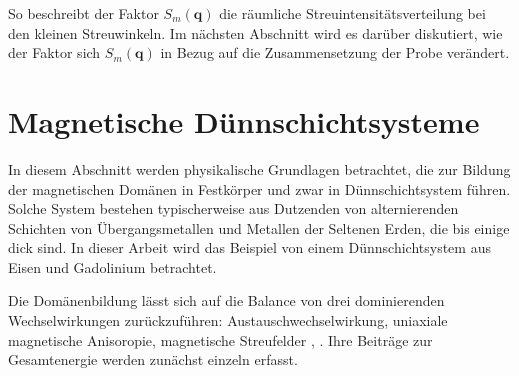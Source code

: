 \noindent
So beschreibt der Faktor $S_m(\mathbf{q})$ die räumliche Streuintensitätsverteilung bei den kleinen Streuwinkeln. Im nächsten Abschnitt wird es darüber diskutiert, wie der Faktor sich $S_m(\mathbf{q})$ in Bezug auf die Zusammensetzung der Probe verändert.

\section{Magnetische Dünnschichtsysteme}
In diesem Abschnitt werden physikalische Grundlagen betrachtet, die zur Bildung der magnetischen Domänen in Festkörper und zwar in Dünnschichtsystem führen. Solche System bestehen typischerweise aus Dutzenden von alternierenden Schichten von Übergangsmetallen und Metallen der Seltenen Erden, die bis einige  dick sind. In dieser Arbeit wird das Beispiel von einem Dünnschichtsystem aus Eisen und Gadolinium betrachtet.

\noindent
Die Domänenbildung lässt sich auf die Balance von drei dominierenden Wechselwirkungen zurückzuführen: Austauschwechselwirkung, uniaxiale magnetische Anisoropie, magnetische Streufelder \cite{hubert_magnetic_1998}, \cite{hellwig_domain_2007}. Ihre Beiträge zur Gesamtenergie werden zunächst einzeln erfasst.

